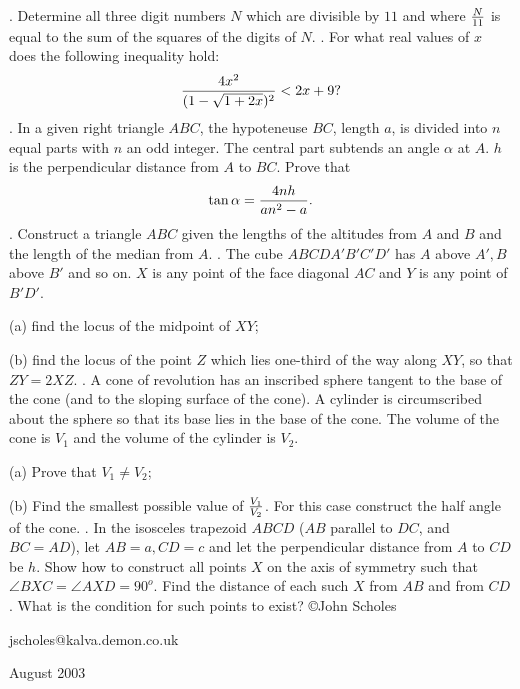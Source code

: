 \nopagenumbers
{}
\vskip 25pt
. Determine all three digit numbers $N$ which are divisible by $11$ and where $N\over11$ is equal to the sum of the squares of the digits of $N$.
\vskip 12pt
. For what real values of $x$ does the following inequality hold: $${4x^2\over(1-\sqrt{1+2x})^2}<2x+9?$$
\vskip 12pt
. In a given right triangle $ABC$, the hypoteneuse $BC$, length $a$, is divided into $n$ equal parts with $n$ an odd integer. The central part subtends an angle $\alpha$ at $A$. $h$ is the perpendicular distance from $A$ to $BC$. Prove that $$\tan\alpha={4nh\over an^2-a}.$$
\vskip 12pt
. Construct a triangle $ABC$ given the lengths of the altitudes from $A$ and $B$ and the length of the median from $A$.
\vskip 12pt
. The cube $ABCDA'B'C'D'$ has $A$ above $A',B$ above $B'$ and so on. $X$ is any point of the face diagonal $AC$ and $Y$ is any point of $B'D'$.

(a) find the locus of the midpoint of $XY$;

(b) find the locus of the point $Z$ which lies one-third of the way along $XY$, so that $ZY=2XZ$.
\vskip 12pt
. A cone of revolution has an inscribed sphere tangent to the base of the cone (and to the sloping surface of the cone). A cylinder is circumscribed about the sphere  so that its base lies in the base of the cone. The volume of the cone is $V_1$ and the volume of the cylinder is $V_2$.

(a) Prove that $V_1\ne V_2$;

(b) Find the smallest possible value of $V_1\over V_2$. For this case construct the half angle of the cone.
\vskip 12pt
. In the isosceles trapezoid $ABCD$ ($AB$ parallel to $DC$, and $BC=AD$), let $AB=a,CD=c$ and let the perpendicular distance from $A$ to $CD$ be $h$. Show how to construct all points $X$ on the axis of symmetry such that $\angle BXC=\angle AXD=90^o$. Find the distance of each such $X$ from $AB$ and from $CD$. What is the condition for such points to exist?
\vskip 20pt
\noindent \copyright John Scholes

\noindent jscholes@kalva.demon.co.uk

 August 2003

\bye

